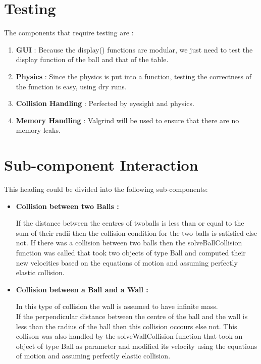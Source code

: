 \documentclass[]{article}
\begin{document}
\section{Testing}
The components that require testing are :
\begin{enumerate}
\item \textbf{GUI} : Because the display() functions are modular, we just need to test the display function of the ball and that of the table.
\item \textbf{Physics} : Since the physics is put into a function, testing the correctness of the function is easy, using dry runs.
\item \textbf{Collision Handling} : Perfected by eyesight and physics.
\item \textbf{Memory Handling} : Valgrind will be used to ensure that there are no memory leaks.
\end{enumerate}
\section{Sub-component Interaction}
\begin{flushleft}
This heading could be divided into the following sub-components:
\begin{itemize}

\item \textbf{Collision between two Balls :}\\

\begin{flushleft}
If the distance between the centres of twoballs is less than or equal to the sum of their radii then the collision condition for the two balls is satisfied else not. If there was a collision between two balls then the solveBallCollision function was called that took two objects of type Ball and computed their new velocities based on the equations of motion and assuming perfectly elastic collision.
\end{flushleft}

\item \textbf{Collision between a Ball and a Wall :} \\

\begin{flushleft}
In this type of collision the wall is assumed to have infinite mass.\\
If the perpendicular distance between the centre of the ball and the wall is less than the radius of the ball then this collision occours else not. This collison was also handled by the solveWallCollision function that took an object of type Ball as parameter and modified its velocity using the equations of motion and assuming perfectly elastic collision.
\end{flushleft}  
\end{itemize}
\end{flushleft}
\end{document}
